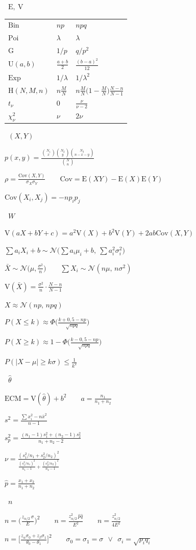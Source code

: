 \documentclass[10pt,a4paper]{extarticle}
\newcommand{\E}{\mathrm{E}}
\newcommand{\V}{\mathrm{V}}
\newcommand{\Cov}{\mathrm{Cov}}
\newcommand{\xb}{\bar{x}}
\newcommand{\Xb}{\bar{X}}
\newcommand{\sq}[1]{\sqrt{#1}}
\newcommand{\etq}[1]{\par\vspace{3pt}\noindent\colorbox{azul}{\color{white}\strut\ $#1$\ }\par\vspace{2pt}}
\newcommand{\fm}[1]{\par\noindent$\displaystyle #1$\par\vspace{2.5pt}}
\begin{document}
\small
\begin{multicols}{2}
\etq{\E,\ \V}
\renewcommand{\arraystretch}{1.2}
\noindent\begin{tabular}{@{}lll@{}}
$\mathrm{Bin}$ & $np$ & $npq$\\
$\mathrm{Poi}$ & $\lambda$ & $\lambda$\\
$\mathrm{G}$ & $1/p$ & $q/p^2$\\
$\mathrm{U}(a,b)$ & $\frac{a+b}2$ & $\frac{(b-a)^2}{12}$\\
$\mathrm{Exp}$ & $1/\lambda$ & $1/\lambda^2$\\
$\mathrm{H}(N,M,n)$ & $n\frac MN$ & $n\frac MN\big(1-\frac MN\big)\frac{N-n}{N-1}$\\
$t_\nu$ & $0$ & $\frac{\nu}{\nu-2}$\\
$\chi^2_\nu$ & $\nu$ & $2\nu$\\
\end{tabular}

\etq{(X,Y)}
\fm{p(x,y)=\frac{\binom{N_1}{x}\binom{N_2}{y}\binom{N_3}{n-x-y}}{\binom Nn}}
\fm{\rho=\frac{\Cov(X,Y)}{\sigma_X\sigma_Y}\qquad \Cov=\E(XY)-\E(X)\E(Y)}
\fm{\Cov(X_i,X_j)=-np_ip_j}

\etq{W}
\fm{\V(aX+bY+c)=a^2\V(X)+b^2\V(Y)+2ab\Cov(X,Y)}
\fm{\sum a_iX_i+b\sim\mathcal N\Big(\sum a_i\mu_i+b,\ \sum a_i^2\sigma_i^2\Big)}
\fm{\Xb\sim\mathcal N\Big(\mu,\frac{\sigma^2}{n}\Big)\qquad \sum X_i\sim\mathcal N(n\mu,\,n\sigma^2)}
\fm{\V(\Xb)=\frac{\sigma^2}{n}\cdot\frac{N-n}{N-1}}
\fm{X\approx\mathcal N(np,\,npq)}
\fm{P(X\le k)\approx\Phi\Big(\frac{k+0{,}5-np}{\sq{npq}}\Big)}
\fm{P(X\ge k)\approx1-\Phi\Big(\frac{k-0{,}5-np}{\sq{npq}}\Big)}
\fm{P(|X-\mu|\ge k\sigma)\le\frac1{k^2}}

\etq{\hat\theta}
\fm{\mathrm{ECM}=\V(\hat\theta)+b^2\qquad a=\frac{n_1}{n_1+n_2}}
\fm{s^2=\frac{\sum x_i^2-n\xb^2}{n-1}}
\fm{s_p^2=\frac{(n_1-1)s_1^2+(n_2-1)s_2^2}{n_1+n_2-2}}
\fm{\nu=\frac{(s_1^2/n_1+s_2^2/n_2)^2}{\frac{(s_1^2/n_1)^2}{n_1-1}+\frac{(s_2^2/n_2)^2}{n_2-1}}}
\fm{\hat p=\frac{x_1+x_2}{n_1+n_2}}

\etq{n}
\fm{n=\Big(\frac{z_{\alpha/2}\,\sigma}{E}\Big)^2\qquad n=\frac{z_{\alpha/2}^2\,\hat p\hat q}{E^2}\qquad n=\frac{z_{\alpha/2}^2}{4E^2}}
\fm{n=\Big[\frac{z_\alpha\sigma_0+z_\beta\sigma_1}{\theta_0-\theta_1}\Big]^2\qquad \sigma_0=\sigma_1=\sigma\ \ \vee\ \ \sigma_i=\sq{p_iq_i}}
\end{multicols}
\end{document}
